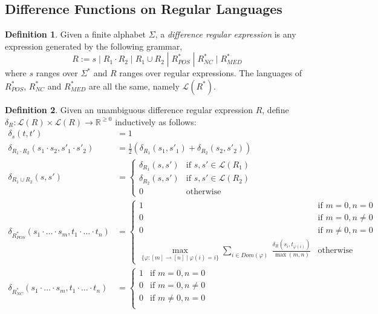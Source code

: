 \documentclass[acmsmall,review,anonymous]{acmart}\settopmatter{printfolios=true,printccs=false,printacmref=false}
\theoremstyle{definition}
\newtheorem{definition}{Definition}
\begin{document}
\subsection{Difference Functions on Regular Languages}
\begin{definition}
Given a finite alphabet $\Sigma$, a {\em difference regular expression} is any expression generated by the following grammar,
$$R := s \; | \; R_1 \cdot R_2 \; | \; R_1 \cup R_2 \; | \; R^*_{POS} \; | \; R^*_{NC} \; | \; R^*_{MED}$$
where $s$ ranges over $\Sigma^*$ and $R$ ranges over regular expressions. The languages of $R^*_{POS}$, $R^*_{NC}$ and $R^*_{MED}$ are all the same, namely $\mathcal{L}(R^*)$.
\end{definition}
\begin{definition}
Given an unambiguous difference regular expression $R$, define $\delta_R : \mathcal{L}(R) \times \mathcal{L}(R) \longrightarrow \mathbb{R}^{\geq 0}$ inductively as follows:
\begin{align*}
\delta_s(t, t') &= 1\\
\delta_{R_1 \cdot R_2}(s_1 \cdot s_2, s'_1 \cdot s'_2) &= \frac{1}{2}(\delta_{R_1}(s_1, s'_1) + \delta_{R_2}(s_2, s'_2))\\
\delta_{R_1 \cup R_2}(s, s') &= 
\begin{cases}
\delta_{R_1}(s, s') & \text{if }s, s' \in \mathcal{L}(R_1) \\
\delta_{R_2}(s, s') & \text{if }s, s' \in \mathcal{L}(R_2)\\
0 & \text{otherwise }
\end{cases}\\
\delta_{R^*_{POS}}(s_1 \cdot \ldots \cdot s_m, t_1 \cdot \ldots \cdot t_n) &= 
\begin{cases}
1 & \text{if } m = 0, n = 0\\ 
0 & \text{if } m = 0, n \neq 0\\
0 & \text{if } m \neq 0, n = 0\\\max\limits_{\{\varphi : [m] \rightharpoonup [n] \; | \; \varphi(i) = i\}}\sum\limits_{i \in Dom(\varphi)}\ \frac{\delta_R(s_i, t_{\varphi(i)})}{\max(m,n)}& \text{otherwise}
\end{cases}\\
\delta_{R^*_{NC}}(s_1 \cdot \ldots \cdot s_m, t_1 \cdot \ldots \cdot t_n) &= 
\begin{cases}
1 & \text{if } m = 0, n = 0\\ 
0 & \text{if } m = 0, n \neq 0\\
0 & \text{if } m \neq 0, n = 0\\

\end{cases}
\end{align*}
\end{definition}
\end{document}
